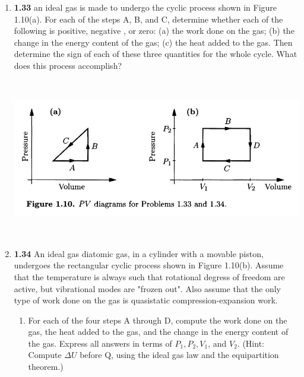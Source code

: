 \documentclass[fleqn]{article}
\begin{document}
\begin{enumerate}
\begin{enumerate}
    \end{enumerate}


    \item \textbf{1.33} an ideal gas is made to undergo the cyclic process shown in Figure 1.10(a). For
    each of the steps A, B, and C, determine whether each of the following is positive, negative , or zero: 
    (a) the work done on the gas; (b) the change in the energy content of the gas; (c) the heat added to the gas. 
    Then determine the sign of each of these three quantities for the whole cycle. What does this process accomplish?

    \begin{center}
      \includegraphics[height=7cm, width=16cm]{1.JPG}
    \end{center}


    \item \textbf{1.34} An ideal gas diatomic gas, in a cylinder with a movable piston, undergoes the rectangular cyclic process
    shown in Figure 1.10(b). Assume that the temperature is always such that rotational degress of freedom are active, but vibrational
    modes are "frozen out". Also assume that the only type of work done on the gas is quasistatic compression-expansion work.
    \begin{enumerate}
      \item For each of the four steps A through D, compute the work done on the gas, the heat added to the gas, and the change in the energy
      content of the gas. Express all answers in terms of $P_1, P_2, V_1$, and $V_2$. (Hint: Compute $\Delta U$ before Q, using
      the ideal gas law and the equipartition theorem.)



\end{enumerate}
\end{enumerate}
\end{document}
